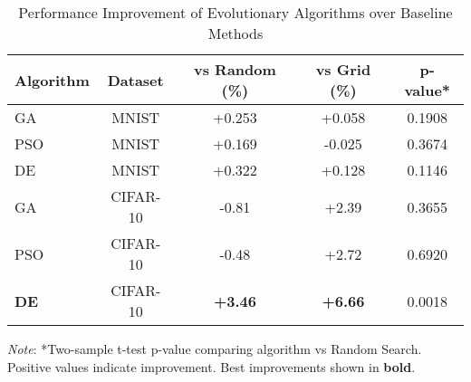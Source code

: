 \begin{table}[htbp]
\centering
\caption{Performance Improvement of Evolutionary Algorithms over Baseline Methods}
\label{tab:performance_improvement}
\begin{tabular}{lcccc}
\toprule
\textbf{Algorithm} & \textbf{Dataset} & \textbf{vs Random (\%)} & \textbf{vs Grid (\%)} & \textbf{p-value*} \\
\midrule
GA & MNIST & +0.253 & +0.058 & 0.1908 \\
PSO & MNIST & +0.169 & -0.025 & 0.3674 \\
DE & MNIST & +0.322 & +0.128 & 0.1146 \\
\midrule
GA & CIFAR-10 & -0.81 & +2.39 & 0.3655 \\
PSO & CIFAR-10 & -0.48 & +2.72 & 0.6920 \\
\textbf{DE} & CIFAR-10 & \textbf{+3.46} & \textbf{+6.66} & 0.0018 \\
\bottomrule
\end{tabular}
\vspace{2mm}
\begin{minipage}{\textwidth}
\small
\textit{Note}: *Two-sample t-test p-value comparing algorithm vs Random Search. Positive values indicate improvement. Best improvements shown in \textbf{bold}.
\end{minipage}
\end{table}
